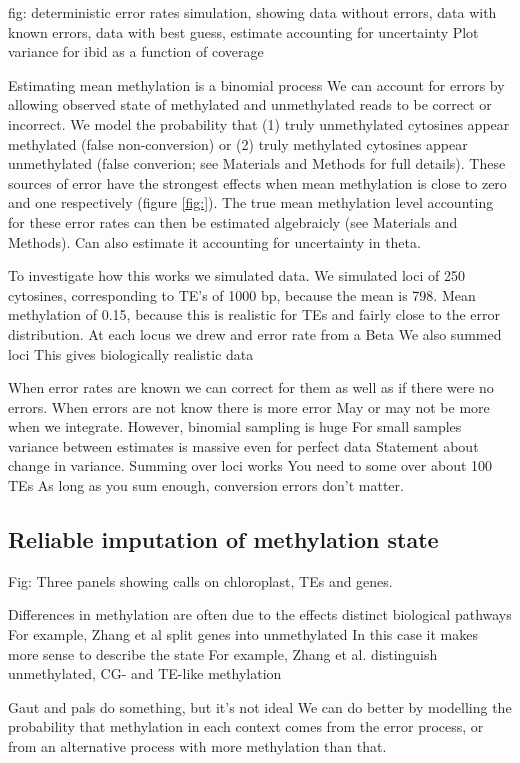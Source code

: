 \documentclass[12pt,longbibliography]{article}
\begin{document}
fig:
    deterministic error rates
    simulation, showing data without errors, data with known errors, data with best guess, estimate accounting for uncertainty
    Plot variance for ibid as a function of coverage


Estimating mean methylation is a binomial process
We can account for errors by allowing observed state of methylated and unmethylated reads to be correct or incorrect.
We model the probability that (1) truly unmethylated cytosines appear methylated (false non-conversion) or (2) truly methylated cytosines appear unmethylated (false converion; see Materials and Methods for full details).
These sources of error have the strongest effects when mean methylation is close to zero and one respectively (figure \ref{fig:}).
The true mean methylation level accounting for these error rates can then be estimated algebraicly (see Materials and Methods).
Can also estimate it accounting for uncertainty in theta.

To investigate how this works we simulated data.
We simulated loci of 250 cytosines, corresponding to TE's of 1000 bp, because the mean is 798.
Mean methylation of 0.15, because this is realistic for TEs and fairly close to the error distribution.
At each locus we drew and error rate from a Beta
We also summed loci
This gives biologically realistic data

When error rates are known we can correct for them as well as if there were no errors.
When errors are not know there is more error
May or may not be more when we integrate.
However, binomial sampling is huge
For small samples variance between estimates is massive even for perfect data
Statement about change in variance.
Summing over loci works
You need to some over about 100 TEs
As long as you sum enough, conversion errors don't matter.

\subsection{Reliable imputation of methylation state}

Fig: Three panels showing calls on chloroplast, TEs and genes.

Differences in methylation are often due to the effects distinct biological pathways
For example, Zhang et al split genes into unmethylated 
In this case it makes more sense to describe the state
For example, Zhang et al. distinguish unmethylated, CG- and TE-like methylation

Gaut and pals do something, but it's not ideal
We can do better by modelling the probability that methylation in each context
comes from the error process, or from an alternative process with more methylation
than that.
\end{document}
